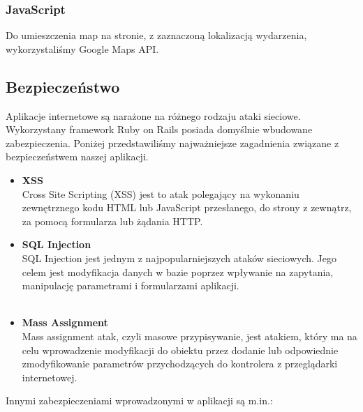       \subsubsection{JavaScript}
      Do umieszczenia map na stronie, z zaznaczoną lokalizacją wydarzenia, wykorzystaliśmy Google Maps API.

      

    \subsection{Bezpieczeństwo}
    Aplikacje internetowe są narażone na różnego rodzaju ataki sieciowe. Wykorzystany framework Ruby on Rails posiada domyślnie wbudowane zabezpieczenia. Poniżej przedstawiliśmy najważniejsze zagadnienia związane z bezpieczeństwem naszej aplikacji.
      \begin{itemize}
        \item \textbf{XSS}\\ 
        Cross Site Scripting (XSS) jest to atak polegający na wykonaniu zewnętrznego kodu HTML lub JavaScript przesłanego, do strony z zewnątrz, za pomocą formularza lub żądania HTTP.

        
        \clearpage
        \item \textbf{SQL Injection}\\ 
        SQL Injection jest jednym z najpopularniejszych ataków sieciowych. Jego celem jest modyfikacja danych w bazie poprzez wpływanie na zapytania, manipulację parametrami i formularzami aplikacji.\\\\
        

        \item \textbf{Mass Assignment} \\ 
        Mass assignment atak, czyli masowe przypisywanie, jest atakiem, który ma na celu wprowadzenie modyfikacji do obiektu przez dodanie lub odpowiednie zmodyfikowanie parametrów przychodzących do kontrolera z przeglądarki internetowej.\\
        
      \end{itemize}
    Innymi zabezpieczeniami wprowadzonymi w aplikacji są m.in.:
